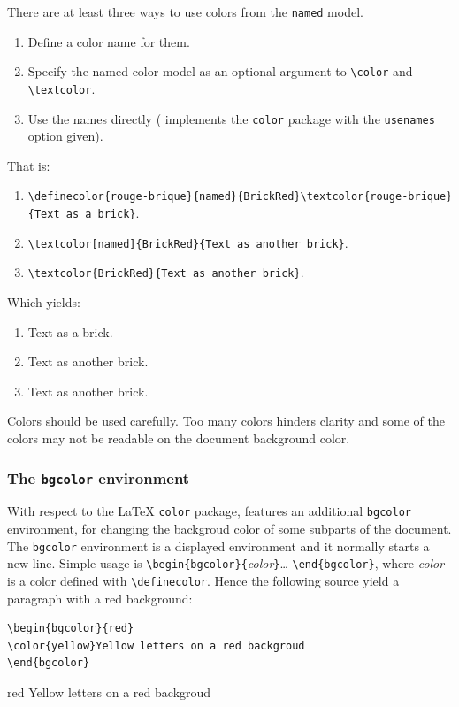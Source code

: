 There are at least three ways to use colors from the \texttt{named}
 model.
\begin{enumerate}
\item Define a color name for them.
\item Specify the named color model as an optional argument to
 \verb+\color+ and \verb+\textcolor+.
\item Use the names directly
(\hevea{} implements the \texttt{color} package with
the \texttt{usenames} option given).
\end{enumerate}
That is:
\begin{enumerate}
\item
\verb+\definecolor{rouge-brique}{named}{BrickRed}\textcolor{rouge-brique}{Text as a brick}+.
\item \verb+\textcolor[named]{BrickRed}{Text as another brick}+.
\item \verb+\textcolor{BrickRed}{Text as another brick}+.
\end{enumerate}
\ifhevea Which yields:
\begin{enumerate}
\item {}
\textcolor{rouge-brique}{Text as a brick}.
\item \textcolor[named]{BrickRed}{Text as another brick}.
\item \textcolor{BrickRed}{Text as another brick}.
\end{enumerate}\fi


Colors should be used carefully. Too many colors
hinders clarity and some of the colors may not be readable on the
document background color.

\subsubsection{The \texttt{bgcolor} environment}
\label{bgcolor}
With respect to the \LaTeX{} \texttt{color} package, \hevea{} features
an additional
\texttt{bgcolor} environment, for changing the backgroud color of some
subparts of the document.
The \texttt{bgcolor} environment is a displayed environment and it
normally starts a new line.
Simple usage is \verb+\begin{bgcolor}{+\textit{color}\verb+}+\ldots{}
\verb+\end{bgcolor}+, where
\textit{color} is a color defined with \verb+\definecolor+.
Hence the following source yield a paragraph with a red background:
\begin{verbatim}
\begin{bgcolor}{red}
\color{yellow}Yellow letters on a red backgroud
\end{bgcolor}
\end{verbatim}
\begin{htmlonly}
\begin{bgcolor}{red}
\color{yellow}Yellow letters on a red backgroud
\end{bgcolor}
\end{htmlonly}

